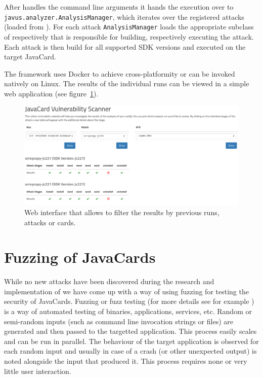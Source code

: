 \documentclass{../llncs/llncs}
\begin{document}
    After \shortappclass handles the command line arguments it hands the execution over to \texttt{javus.analyzer.AnalysisManager}, which iterates over the registered attacks (loaded from ). For each attack \texttt{AnalysisManager} loads the appropriate subclass of \shortbuilderclass respectively \shortexecutorclass that is responsible for building, respectively executing the attack. Each attack is then build for all supported SDK versions and executed on the target JavaCard.

    The framework uses Docker to achieve cross-platformity or can be invoked natively on Linux. The results of the individual runs can be viewed in a simple web application (see figure~\ref{fig:web-interface-pic}).

    \begin{figure}[htb!]
        \centering
        \includegraphics[width=\textwidth]{src/imgs/web-app-all.png}
        \caption{Web interface that allows to filter the results by previous runs, attacks or cards.\label{fig:web-interface-pic}}
    \end{figure}
\section{Fuzzing of JavaCards\label{sec:fuzzing}}
While no new attacks have been discovered during the research and implementation of \projectname we have come up with a way of using fuzzing for testing the security of JavaCards. Fuzzing or fuzz testing (for more details see for example \cite{ossfuzz}) is a way of automated testing of binaries, applications, services, etc. Random or semi-random inputs (such as command line invocation strings or files) are generated and then passed to the targetted application. This process easily scales and can be run in parallel. The behaviour of the target application is observed for each random input and usually in case of a crash (or other unexpected output) is noted alongside the input that produced it. This process requires none or very little user interaction.
\end{document}

